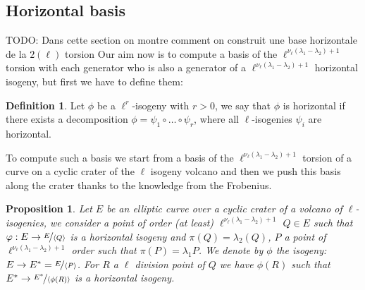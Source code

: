 \documentclass{article}
\newcommand{\todo}[1]{{\color{red}TODO: #1}}
\theoremstyle{plain}
\newtheorem{prop}[thm]{Proposition}
\theoremstyle{definition}
\newtheorem{defi}[thm]{Definition}
\theoremstyle{remark}
\begin{document}
\subsection{Horizontal basis}
\todo{Dans cette section on montre comment on construit une base horizontale de la $2(\ell)$ torsion}
Our aim now is to compute  a basis of the $\ell^{\nu_{\ell}(\lambda_1-\lambda_2)+1}$ torsion with each generator who is also a generator of a $\ell^{\nu_{\ell}(\lambda_1-\lambda_2)+1}$ horizontal isogeny, but first we have to define them:

\begin{defi}%
Let $\phi$ be a $\ell^r$-isogeny with $r>0$, we say that $\phi$ is horizontal  if there exists a decomposition $\phi = \psi_1 \circ … \circ \psi_r$, where all $\ell$-isogenies $\psi_i$ are horizontal.
\end{defi}

To compute such a basis we start from a basis of the $\ell^{\nu_{\ell}(\lambda_1-\lambda_2)+1}$ torsion of a curve on a cyclic crater of the $\ell$ isogeny volcano and then we push this basis along the crater thanks to the knowledge from the Frobenius.

\begin{prop}\label{propcentrale}
Let $E$ be an elliptic curve over a cyclic crater of a volcano of $\ell$-isogenies, we consider a  point of order (at least) $\ell^{\nu_{\ell}(\lambda_1-\lambda_2)+1}$ $Q \in E$ such that $\varphi: E \rightarrow \nicefrac{E}{\langle Q \rangle }$ is a horizontal isogeny and $\pi(Q)=\lambda_2(Q)$, $P$ a point of $\ell^{\nu_{\ell}(\lambda_1-\lambda_2)+1}$ order such that $\pi(P) = \lambda_1P$. We denote by $\phi$ the isogeny: $E\rightarrow E^*=\nicefrac{E}{\langle P \rangle}$. For $R$ a $\ell$ division point of $Q$ we have $\phi(R)$ such that $E^* \rightarrow \nicefrac{E^*}{\langle \phi(R) \rangle}$ is a horizontal isogeny.  
\end{prop}
\end{document}
